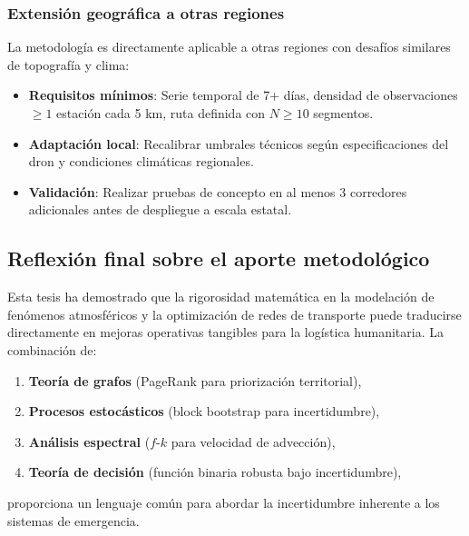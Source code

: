 \documentclass[
  spanish,
  us-letterpaper,
]{scrreprt}
\providecommand{\tightlist}{%
  \setlength{\itemsep}{0pt}\setlength{\parskip}{0pt}}
\numberwithin{equation}{section}
\begin{document}
\subsubsection*{Extensión geográfica a otras
regiones}\label{extensiuxf3n-geogruxe1fica-a-otras-regiones}

La metodología es directamente aplicable a otras regiones con desafíos
similares de topografía y clima:

\begin{itemize}
\tightlist
\item
  \textbf{Requisitos mínimos}: Serie temporal de 7+ días, densidad de
  observaciones \(\geq 1\) estación cada 5 km, ruta definida con
  \(N \geq 10\) segmentos.
\item
  \textbf{Adaptación local}: Recalibrar umbrales técnicos según
  especificaciones del dron y condiciones climáticas regionales.
\item
  \textbf{Validación}: Realizar pruebas de concepto en al menos 3
  corredores adicionales antes de despliegue a escala estatal.
\end{itemize}

\subsection{Reflexión final sobre el aporte
metodológico}\label{reflexiuxf3n-final-sobre-el-aporte-metodoluxf3gico}

Esta tesis ha demostrado que la rigorosidad matemática en la modelación
de fenómenos atmosféricos y la optimización de redes de transporte puede
traducirse directamente en mejoras operativas tangibles para la
logística humanitaria. La combinación de:

\begin{enumerate}
\def\labelenumi{\arabic{enumi}.}
\tightlist
\item
  \textbf{Teoría de grafos} (PageRank para priorización territorial),
\item
  \textbf{Procesos estocásticos} (block bootstrap para incertidumbre),
\item
  \textbf{Análisis espectral} (\(f\)-\(k\) para velocidad de advección),
\item
  \textbf{Teoría de decisión} (función binaria robusta bajo
  incertidumbre),
\end{enumerate}

proporciona un lenguaje común para abordar la incertidumbre inherente a
los sistemas de emergencia.
\end{document}
